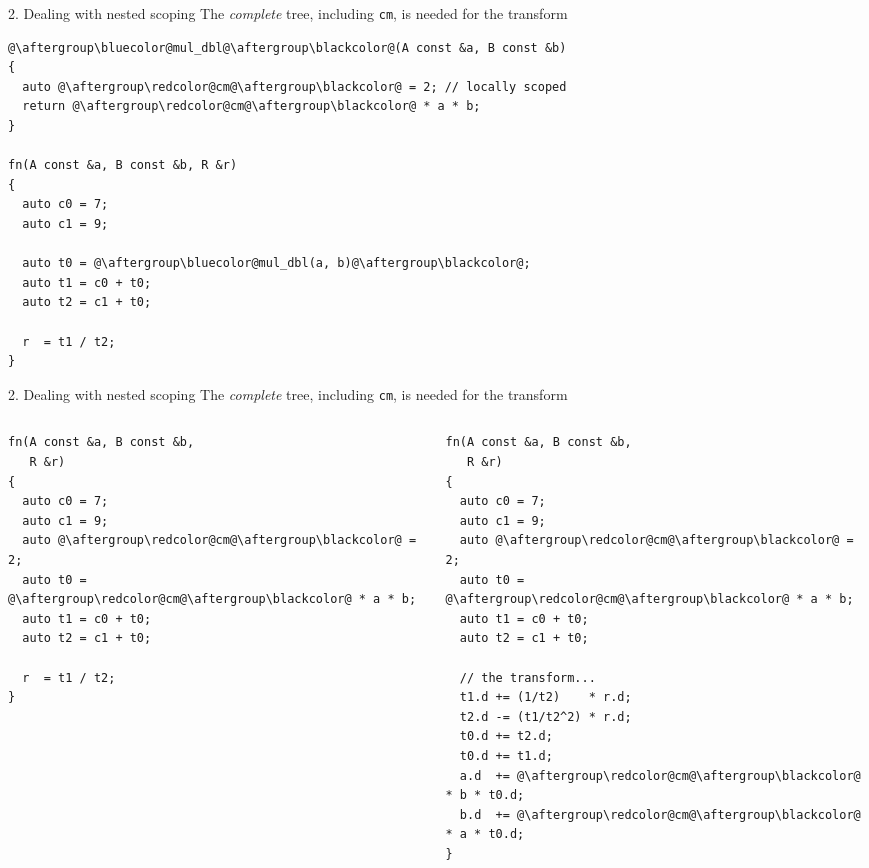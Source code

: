 \documentclass[xcolor=dvipsnames]{beamer}
\begin{document}
\begin{frame}[fragile]{2. Dealing with nested scoping}
The \emph{complete} tree, including {\color{red}\texttt{cm}}, is needed for the transform

      \begin{lstlisting}
@\aftergroup\bluecolor@mul_dbl@\aftergroup\blackcolor@(A const &a, B const &b)
{
  auto @\aftergroup\redcolor@cm@\aftergroup\blackcolor@ = 2; // locally scoped
  return @\aftergroup\redcolor@cm@\aftergroup\blackcolor@ * a * b;
}

fn(A const &a, B const &b, R &r)
{
  auto c0 = 7;
  auto c1 = 9;

  auto t0 = @\aftergroup\bluecolor@mul_dbl(a, b)@\aftergroup\blackcolor@;
  auto t1 = c0 + t0;
  auto t2 = c1 + t0;

  r  = t1 / t2;
}
  \end{lstlisting}
\end{frame}


\begin{frame}[fragile]{2. Dealing with nested scoping}
The \emph{complete} tree, including {\color{red}\texttt{cm}}, is needed for the transform
  \begin{columns}[T] %
    \begin{column}{0.44\textwidth}
      \begin{lstlisting}
fn(A const &a, B const &b,
   R &r)
{
  auto c0 = 7;
  auto c1 = 9;
  auto @\aftergroup\redcolor@cm@\aftergroup\blackcolor@ = 2;
  auto t0 = @\aftergroup\redcolor@cm@\aftergroup\blackcolor@ * a * b;
  auto t1 = c0 + t0;
  auto t2 = c1 + t0;

  r  = t1 / t2;
}
  \end{lstlisting}
    \end{column}%
    \hfill%
    \begin{column}{0.56\textwidth}
        \begin{lstlisting}
fn(A const &a, B const &b,
   R &r)
{
  auto c0 = 7;
  auto c1 = 9;
  auto @\aftergroup\redcolor@cm@\aftergroup\blackcolor@ = 2;
  auto t0 = @\aftergroup\redcolor@cm@\aftergroup\blackcolor@ * a * b;
  auto t1 = c0 + t0;
  auto t2 = c1 + t0;

  // the transform...
  t1.d += (1/t2)    * r.d;
  t2.d -= (t1/t2^2) * r.d;
  t0.d += t2.d;
  t0.d += t1.d;
  a.d  += @\aftergroup\redcolor@cm@\aftergroup\blackcolor@ * b * t0.d;
  b.d  += @\aftergroup\redcolor@cm@\aftergroup\blackcolor@ * a * t0.d;
}
  \end{lstlisting}
    \end{column}%
  \end{columns}
\end{frame}
\end{document}
